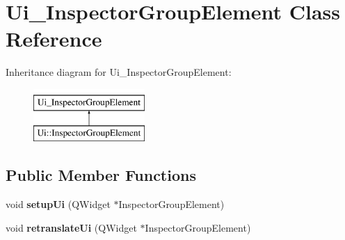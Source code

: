 \hypertarget{class_ui___inspector_group_element}{}\section{Ui\+\_\+\+Inspector\+Group\+Element Class Reference}
\label{class_ui___inspector_group_element}
Inheritance diagram for Ui\+\_\+\+Inspector\+Group\+Element\+:\begin{figure}[H]
\begin{center}
\leavevmode
\includegraphics[height=2.000000cm]{class_ui___inspector_group_element}
\end{center}
\end{figure}
\subsection*{Public Member Functions}
\begin{DoxyCompactItemize}
\item 
\mbox{\label{class_ui___inspector_group_element_a145414ab3ac3c34b569eb012dc6ee1fc}} 
void {\bfseries setup\+Ui} (Q\+Widget $\ast$Inspector\+Group\+Element)
\item 
\mbox{\label{class_ui___inspector_group_element_abd2e6f14b2e5de7016a809c501afea8a}} 
void {\bfseries retranslate\+Ui} (Q\+Widget $\ast$Inspector\+Group\+Element)
\end{DoxyCompactItemize}
